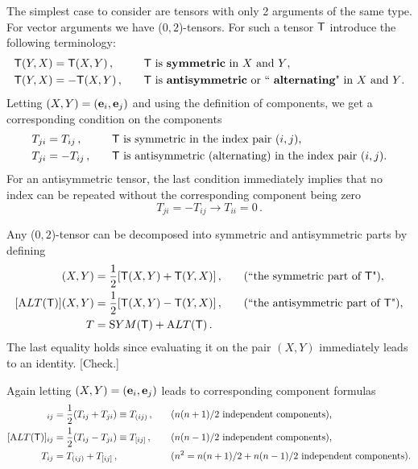     The simplest case to consider are tensors with only 2 arguments of the same type. For vector arguments we have ($0,2$)-tensors. For such a tensor $\mathsf{T}$ introduce the following terminology:
\begin{align*}
    \tsor{T}(Y,X)&=\tsor{T}(X,Y)\,,\quad  &&\text{$\tsor{T}$ is  \negrito{symmetric} in $X$ and $Y$,}
\\
    \tsor{T}(Y,X)&=-\tsor{T}(X,Y)\,,\quad  &&\text{$\tsor{T}$ is  \negrito{antisymmetric} or `` \negrito{alternating}" in $X$ and $Y$.}
\end{align*}
    Letting $(X,Y)=(\mathbf{ e}_i,\mathbf{ e}_j)$ and using the definition of components, we get a corresponding condition on the components
\begin{align*} 
    T_{ji} &= T_{ij}\,, \quad &&\text{$\mathsf{T}$ is symmetric in the index pair $(i,j)$,}
\\
    T_{ji} &=- T_{ij}\,, \quad &&\text{$\mathsf{T}$ is antisymmetric (alternating) in the index pair $(i,j)$.}
\end{align*}
For an antisymmetric tensor, the last condition immediately implies that no index can be repeated without the corresponding component being zero
$$
 T_{ji} =- T_{ij} \rightarrow T_{ii}=0\,.
$$

Any ($0,2$)-tensor can be decomposed into symmetric and antisymmetric parts by defining
\begin{align*} 
    [\SYM(\tsor{T})](X,Y) &= \dfrac12 [\tsor{T}(X,Y)+\tsor{T}(Y,X)]\,, \quad  &&\text{(``the symmetric part of $\tsor{T}$"),}
\\
    [\ALT(\tsor{T})](X,Y) &= \dfrac12 [\tsor{T}(X,Y)-\tsor{T}(Y,X)]\,, \quad &&\text{(``the antisymmetric part of $\tsor{T}$"),}
\\
    T &= \SYM(\tsor{T}) + \ALT(\tsor{T})\,.
\end{align*}
The last equality holds since evaluating it on the pair $(X,Y)$ immediately leads to an identity. [Check.]

Again letting $(X,Y)=(\mathbf{ e}_i,\mathbf{ e}_j)$ leads to corresponding component formulas
\begin{align*} 
    [\SYM(\tsor{T})]_{ij} &= \dfrac12 (T_{ij}+T_{ji}) \equiv T_{(ij)}\,,
\quad && \text{($n(n+1)/2$ independent components),}
\\
    [\ALT(\tsor{T})]_{ij} &= \dfrac12 (T_{ij}-T_{ji}) \equiv T_{[ij]}\,,
\quad && \text{($n(n-1)/2$ independent components),}
\\
    T_{ij} &=T_{(ij)} +T_{[ij]}\,,
\quad &&\text{($n^2 = n(n+1)/2 + n(n-1)/2$ independent components).}
\end{align*}

